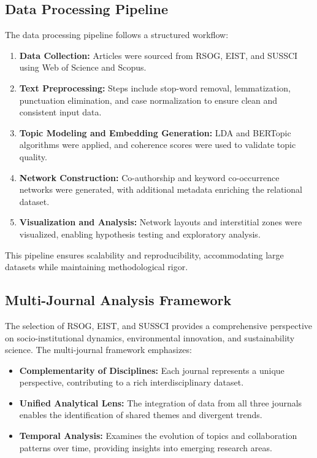 \documentclass[12pt]{article}
\begin{document}
\subsection{Data Processing Pipeline}
The data processing pipeline follows a structured workflow:
\begin{enumerate}
    \item \textbf{Data Collection:} Articles were sourced from RSOG, EIST, and SUSSCI using Web of Science and Scopus.
    \item \textbf{Text Preprocessing:} Steps include stop-word removal, lemmatization, punctuation elimination, and case normalization to ensure clean and consistent input data.
    \item \textbf{Topic Modeling and Embedding Generation:} LDA and BERTopic algorithms were applied, and coherence scores were used to validate topic quality.
    \item \textbf{Network Construction:} Co-authorship and keyword co-occurrence networks were generated, with additional metadata enriching the relational dataset.
    \item \textbf{Visualization and Analysis:} Network layouts and interstitial zones were visualized, enabling hypothesis testing and exploratory analysis.
\end{enumerate}
This pipeline ensures scalability and reproducibility, accommodating large datasets while maintaining methodological rigor.


\subsection{Multi-Journal Analysis Framework}
The selection of RSOG, EIST, and SUSSCI provides a comprehensive perspective on socio-institutional dynamics, environmental innovation, and sustainability science. The multi-journal framework emphasizes:
\begin{itemize}
    \item \textbf{Complementarity of Disciplines:} Each journal represents a unique perspective, contributing to a rich interdisciplinary dataset.
    \item \textbf{Unified Analytical Lens:} The integration of data from all three journals enables the identification of shared themes and divergent trends.
    \item \textbf{Temporal Analysis:} Examines the evolution of topics and collaboration patterns over time, providing insights into emerging research areas.
\end{itemize}
\end{document}

